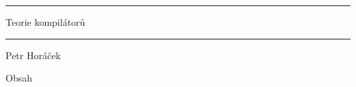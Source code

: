 \nopagenumbers

\hrule width 6in
\tit Teorie kompilátorů
\hrule width 6in

\vskip 5mm
\hfil Petr Horáček\hfil

\newpage

\nonum\notoc\sec Obsah
\maketoc
\newpage

\pagenumbers
